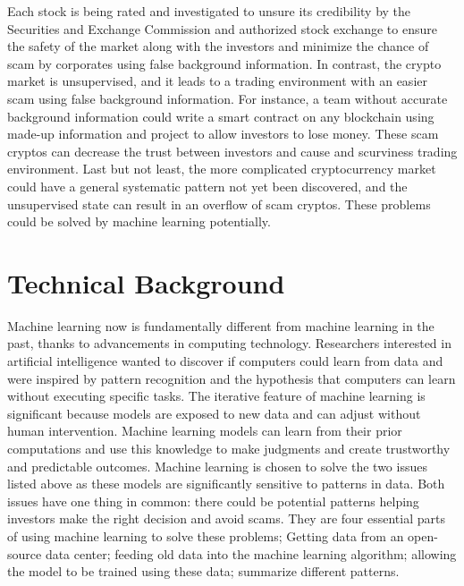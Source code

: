 \documentclass[10pt,twocolumn]{article}
\begin{document}
	Each stock is being rated and investigated to unsure its credibility by the Securities and Exchange Commission and authorized stock exchange to ensure the safety of the market along with the investors and minimize the chance of scam by corporates using false background information. In contrast, the crypto market is unsupervised, and it leads to a trading environment with an easier scam using false background information. For instance, a team without accurate background information could write a smart contract on any blockchain using made-up information and project to allow investors to lose money. These scam cryptos can decrease the trust between investors and cause and scurviness trading environment. Last but not least, the more complicated cryptocurrency market could have a general systematic pattern not yet been discovered, and the unsupervised state can result in an overflow of scam cryptos. These problems could be solved by machine learning potentially. 

\section{Technical Background}
	Machine learning now is fundamentally different from machine learning in the past, thanks to advancements in computing technology. Researchers interested in artificial intelligence wanted to discover if computers could learn from data and were inspired by pattern recognition and the hypothesis that computers can learn without executing specific tasks. The iterative feature of machine learning is significant because models are exposed to new data and can adjust without human intervention. Machine learning models can learn from their prior computations and use this knowledge to make judgments and create trustworthy and predictable outcomes. Machine learning is chosen to solve the two issues listed above as these models are significantly sensitive to patterns in data. Both issues have one thing in common: there could be potential patterns helping investors make the right decision and avoid scams. They are four essential parts of using machine learning to solve these problems; Getting data from an open-source data center; feeding old data into the machine learning algorithm; allowing the model to be trained using these data; summarize different patterns.
\end{document}
